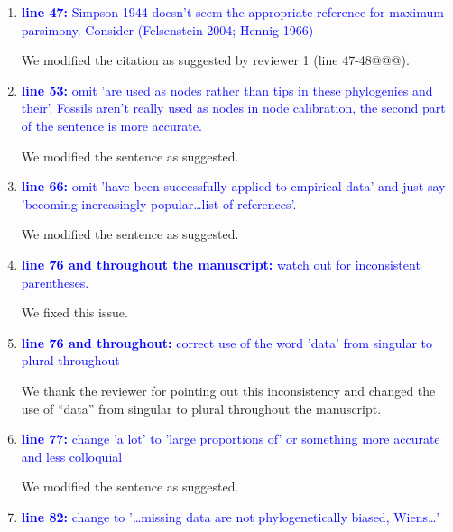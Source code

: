 \documentclass[12pt,letterpaper]{article}
\begin{document}
\begin{enumerate}
\item{\textcolor{blue}{\textbf{line 47:} Simpson 1944 doesn't seem the appropriate reference for maximum parsimony. Consider (Felsenstein 2004; Hennig 1966) }}

We modified the citation as suggested by reviewer 1 (line 47-48@@@).

\item{\textcolor{blue}{\textbf{line 53:} omit 'are used as nodes rather than tips in these phylogenies and their'. Fossils aren't really used as nodes in node calibration, the second part of the sentence is more accurate.}}

We modified the sentence as suggested.

\item{\textcolor{blue}{\textbf{line 66:} omit 'have been successfully applied to empirical data' and just say 'becoming increasingly popular…list of references'. }}

We modified the sentence as suggested.

\item{\textcolor{blue}{\textbf{line 76 and throughout the manuscript:} watch out for inconsistent parentheses.}}

We fixed this issue.

\item{\textcolor{blue}{\textbf{line 76 and throughout:} correct use of the word 'data' from singular to plural throughout}}

We thank the reviewer for pointing out this inconsistency and changed the use of ``data'' from singular to plural throughout the manuscript. 

\item{\textcolor{blue}{\textbf{line 77:} change 'a lot' to 'large proportions of' or something more accurate and less colloquial}}

We modified the sentence as suggested.

\item{\textcolor{blue}{\textbf{line 82:} change to '…missing data are not phylogenetically biased, Wiens…'}}


\end{enumerate}
\end{document}
